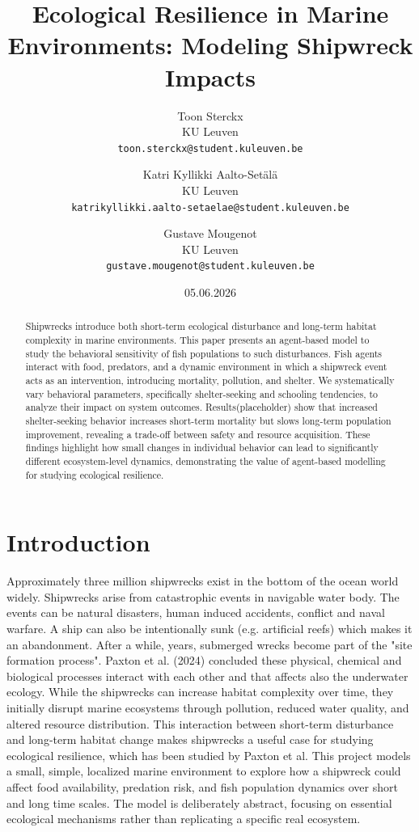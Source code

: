 \documentclass[10pt,a4paper,twocolumn]{article}
\title{Ecological Resilience in Marine Environments: Modeling Shipwreck Impacts}
\author{
  Toon Sterckx \\
  {\small KU Leuven} \\
  \texttt{toon.sterckx@student.kuleuven.be}
  \and
  Katri Kyllikki Aalto-Setälä \\
  {\small KU Leuven} \\
  \texttt{katrikyllikki.aalto-setaelae@student.kuleuven.be}
  \and
  Gustave Mougenot \\
  {\small KU Leuven} \\
  \texttt{gustave.mougenot@student.kuleuven.be}
}
\date{05.06.2026}
\begin{document}
\maketitle

\begin{abstract}
Shipwrecks introduce both short-term ecological disturbance and long-term habitat complexity in marine environments. This paper presents an agent-based model to study the behavioral sensitivity of fish populations to such disturbances. Fish agents interact with food, predators, and a dynamic environment in which a shipwreck event acts as an intervention, introducing mortality, pollution, and shelter. We systematically vary behavioral parameters, specifically shelter-seeking and schooling tendencies, to analyze their impact on system outcomes. Results(placeholder) show that increased shelter-seeking behavior increases short-term mortality but slows long-term population improvement, revealing a trade-off between safety and resource acquisition. These findings highlight how small changes in individual behavior can lead to significantly different ecosystem-level dynamics, demonstrating the value of agent-based modelling for studying ecological resilience.
\end{abstract}

\section{Introduction}
Approximately three million shipwrecks exist in the bottom of the ocean world widely. Shipwrecks arise from catastrophic events in navigable water body. The events can be natural disasters, human induced accidents, conflict and naval warfare. A ship can also be intentionally sunk (e.g. artificial reefs) which makes it an abandonment. After a while, years, submerged wrecks become part of the "site formation process". Paxton et al. (2024) \cite{ShipsPaxton} concluded these physical, chemical and biological processes interact with each other and that affects also the underwater ecology.  While the shipwrecks can increase habitat complexity over time, they initially disrupt marine ecosystems through pollution, reduced water quality, and altered resource distribution. This interaction between short-term disturbance and long-term habitat change makes shipwrecks a useful case for studying ecological resilience, which has been studied by Paxton et al.\cite{ShipsPaxton} This project models a small, simple, localized marine environment to explore how a shipwreck could affect food availability, predation risk, and fish population dynamics over short and long time scales. The model is deliberately abstract, focusing on essential ecological mechanisms rather than replicating a specific real ecosystem.
\end{document}
